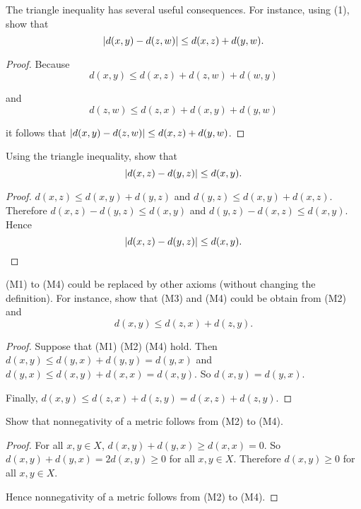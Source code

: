 \begin{exercise}\label{chapter1:section1:exercise12}
    The triangle inequality has several useful consequences. For instance, using (1), show that
    \[
        \left\vert{d(x, y) - d(z, w)}\right\vert\leq d(x, z) + d(y, w).
    \]
\end{exercise}

\begin{proof}
    Because
    \[
        d(x, y)\leq d(x, z) + d(z, w) + d(w, y)
    \]

    and
    \[
        d(z, w)\leq d(z, x) + d(x, y) + d(y, w)
    \]

    it follows that $\left\vert{d(x, y) - d(z, w)}\right\vert\leq d(x, z) + d(y, w)$.
\end{proof}

\begin{exercise}\label{chapter1:section1:exercise13}
    Using the triangle inequality, show that
    \[
        \left\vert{d(x, z) - d(y, z)}\right\vert \leq d(x, y).
    \]
\end{exercise}

\begin{proof}
    $d(x, z)\leq d(x, y) + d(y, z)$ and $d(y, z)\leq d(x, y) + d(x, z)$. Therefore $d(x, z) - d(y, z)\leq d(x, y)$ and $d(y, z) - d(x, z)\leq d(x, y)$. Hence
    \[
        \left\vert{d(x, z) - d(y, z)}\right\vert \leq d(x, y).\qedhere
    \]
\end{proof}

\begin{exercise}\label{chapter1:section1:exercise14}
    (M1) to (M4) could be replaced by other axioms (without changing the definition). For instance, show that (M3) and (M4) could be obtain from (M2) and
    \[
        d(x, y)\leq d(z, x) + d(z, y).
    \]
\end{exercise}

\begin{proof}
    Suppose that (M1) (M2) (M4) hold. Then $d(x, y)\leq d(y, x) + d(y, y) = d(y, x)$ and $d(y, x)\leq d(x, y) + d(x, x) = d(x, y)$. So $d(x, y) = d(y, x)$.

    Finally, $d(x, y)\leq d(z, x) + d(z, y) = d(x, z) + d(z, y)$.
\end{proof}

\begin{exercise}\label{chapter1:section1:exercise15}
    Show that nonnegativity of a metric follows from (M2) to (M4).
\end{exercise}

\begin{proof}
    For all $x, y\in X$, $d(x, y) + d(y, x) \geq d(x, x) = 0$. So $d(x, y) + d(y, x) = 2d(x, y)\geq 0$ for all $x, y\in X$. Therefore $d(x, y)\geq 0$ for all $x, y\in X$.

    Hence nonnegativity of a metric follows from (M2) to (M4).
\end{proof}

